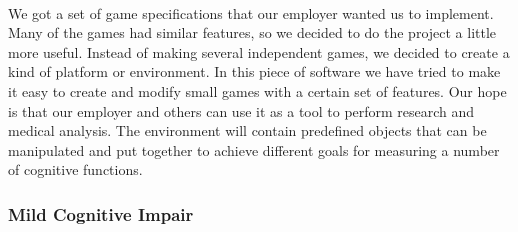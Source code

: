 \\
We got a set of game specifications that our employer wanted us to implement.
Many of the games had similar features, so we decided to do the project a
little more useful.
Instead of making several independent games, we decided to create a kind of 
platform or environment. In this piece of software we have tried to make it
easy to create and modify small games with a certain set of features. Our
hope is that our employer and others can use it as a tool to perform research
and medical analysis. The environment will contain predefined objects that
can be manipulated and put together to achieve different goals for measuring
a number of cognitive functions.

\subsubsection{Mild Cognitive Impair}

